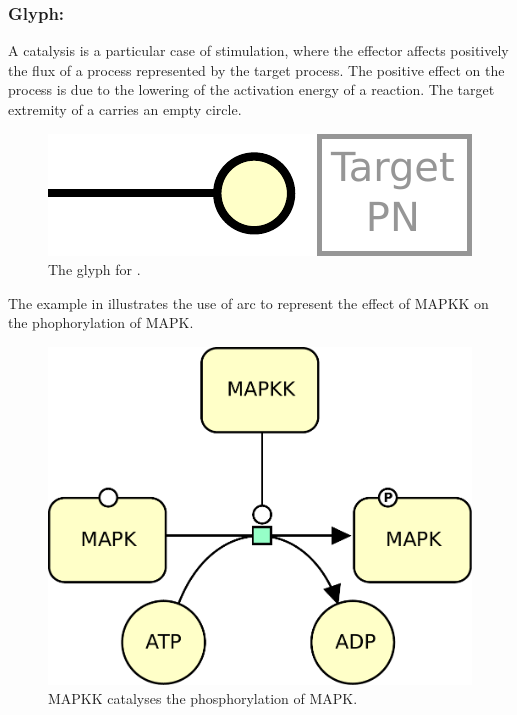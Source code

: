 \subsubsection{Glyph: }\label{sec:catalysis}

A catalysis is a particular case of stimulation, where the effector affects
positively the flux of a process represented by the target process. The positive effect on the process is due to the lowering of the activation energy of a reaction. The target extremity of a  carries an empty circle.

\begin{figure}[H]
  \centering
  \includegraphics[scale = 0.5]{le_images/catalysis}
  \caption{The \PD glyph for .}
  \label{fig:catalysis}
\end{figure}

The example in  illustrates the use of  arc to represent the effect of MAPKK on the phophorylation of MAPK.

\begin{figure}[H]
  \centering
  \includegraphics[scale = 0.5]{le_images/catalysis-MAPK}
  \caption{MAPKK catalyses the phosphorylation of MAPK.}
  \label{fig:catalysis-MAPK}
\end{figure}


